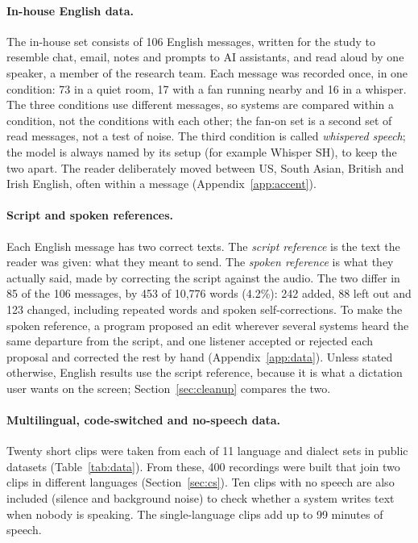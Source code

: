 \documentclass[11pt]{article}
\begin{document}
\paragraph{In-house English data.} The in-house set consists of 106 English messages, written for the study to resemble chat, email, notes and prompts to AI assistants, and read aloud by one speaker, a member of the research team. Each message was recorded once, in one condition: 73 in a quiet room, 17 with a fan running nearby and 16 in a whisper. The three conditions use different messages, so systems are compared within a condition, not the conditions with each other; the fan-on set is a second set of read messages, not a test of noise. The third condition is called \emph{whispered speech}; the model is always named by its setup (for example Whisper SH), to keep the two apart. The reader deliberately moved between US, South Asian, British and Irish English, often within a message (Appendix~\ref{app:accent}).

\paragraph{Script and spoken references.} Each English message has two correct texts. The \emph{script reference} is the text the reader was given: what they meant to send. The \emph{spoken reference} is what they actually said, made by correcting the script against the audio. The two differ in 85 of the 106 messages, by 453 of 10{,}776 words (4.2\%): 242 added, 88 left out and 123 changed, including repeated words and spoken self-corrections. To make the spoken reference, a program proposed an edit wherever several systems heard the same departure from the script, and one listener accepted or rejected each proposal and corrected the rest by hand (Appendix~\ref{app:data}). Unless stated otherwise, English results use the script reference, because it is what a dictation user wants on the screen; Section~\ref{sec:cleanup} compares the two.

\paragraph{Multilingual, code-switched and no-speech data.} Twenty short clips were taken from each of 11 language and dialect sets in public datasets (Table~\ref{tab:data}). From these, 400 recordings were built that join two clips in different languages (Section~\ref{sec:cs}). Ten clips with no speech are also included (silence and background noise) to check whether a system writes text when nobody is speaking. The single-language clips add up to 99 minutes of speech.
\end{document}
